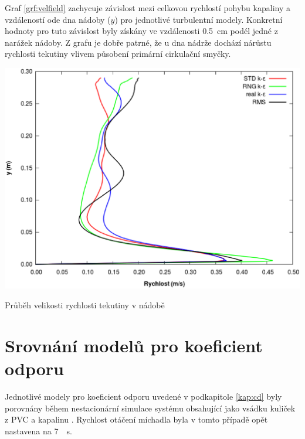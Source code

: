 Graf \ref{grf:velfield} zachycuje závislost mezi celkovou rychlostí pohybu kapaliny a vzdáleností ode dna nádoby ($y$) pro jednotlivé turbulentní modely. Konkretní hodnoty pro tuto závislost byly získány ve vzdálenosti \SI{0.5}{\centi\meter} podél jedné z narážek nádoby. Z grafu je dobře patrné, že u dna nádrže dochází nárůstu rychlosti tekutiny vlivem působení primární cirkulační smyčky.

\begin{grf}[h!]
 \centering
  \includegraphics[scale=0.45]{Results/Velocity/velField.eps}
  \caption{Průběh velikosti rychlosti tekutiny v nádobě}
  \label{grf:velfield}
\end{grf}

\section{Srovnání modelů pro koeficient odporu}
Jednotlivé modely pro koeficient odporu uvedené v podkapitole \ref{kap:cd} byly porovnány během nestacionární simulace systému obsahující jako vsádku  kuliček z PVC a kapalinu \pvpP. Rychlost otáčení míchadla byla v tomto případě opět nastavena na \SI{7}{\per\second}.

